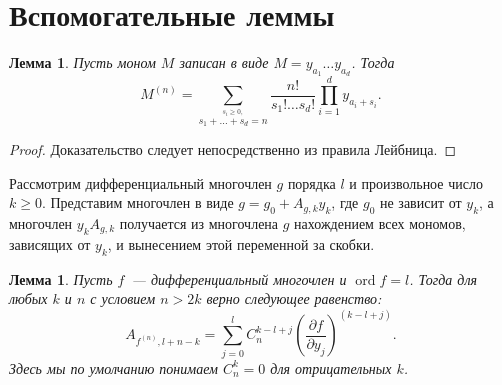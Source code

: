 \documentclass[16pt]{article}
\DeclareMathOperator{\ord}{ord}
\renewcommand{\ge}{\geqslant} %
\theoremstyle{plain}
\newtheorem{lemma}[theorem]{Лемма}
\theoremstyle{definition}
\theoremstyle{remark}
\begin{document}
\section{Вспомогательные леммы}

\begin{lemma}\label{lemma:der_monom}
Пусть моном $M$ записан в виде $M=y_{a_1}\ldots y_{a_d}$. Тогда
$$
M^{(n)} =\sum\limits_{\stackrel{s_i\geqslant0,}{
s_1+\ldots+s_d=n}}\frac{n!}{s_1!\ldots s_d!}
\prod\limits_{i=1}^dy_{a_i+s_i}.
$$
\end{lemma}
\begin{proof}
Доказательство следует непосредственно из правила Лейбница.
\end{proof}
Рассмотрим дифференциальный многочлен $g$ порядка $l$ и произвольное
число $k\ge0$. Представим многочлен в виде $g=g_0+A_{g,k}y_k$, где
$g_0$ не зависит от $y_k$, а многочлен $y_kA_{g,k}$ получается из
многочлена $g$ нахождением всех мономов, зависящих от $y_k$, и
вынесением этой переменной за скобки.


\begin{lemma}\label{lemma:A_fn}
Пусть $f$~--- дифференциальный многочлен и $\ord f = l$.
Тогда для любых $k$ и $n$ с условием $n>2k$ верно следующее
равенство:
$$
A_{f^{(n)}, l + n - k}=\sum\limits_{j=0}^{l}C_n^{k - l + j
}\left(\frac{\partial f}{\partial y_j}\right)^{(k - l + j)}.
$$
Здесь мы по умолчанию понимаем $C_n^{k}=0$ для отрицательных
$k$.
\end{lemma}
\end{document}
